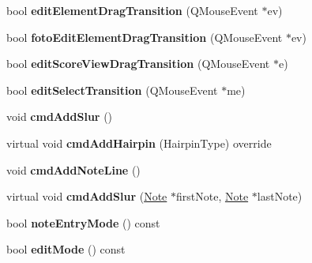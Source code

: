 \begin{DoxyCompactItemize}
\item 
\mbox{\label{class_ms_1_1_score_view_a52a05caf0364d3868f2f0c6b34c45731}} 
bool {\bfseries edit\+Element\+Drag\+Transition} (Q\+Mouse\+Event $\ast$ev)
\item 
\mbox{\label{class_ms_1_1_score_view_aec75a40560544239d6a45e458d9b5170}} 
bool {\bfseries foto\+Edit\+Element\+Drag\+Transition} (Q\+Mouse\+Event $\ast$ev)
\item 
\mbox{\label{class_ms_1_1_score_view_a9a9c293d74eb8e6818e21ff0d2d5de39}} 
bool {\bfseries edit\+Score\+View\+Drag\+Transition} (Q\+Mouse\+Event $\ast$e)
\item 
\mbox{\label{class_ms_1_1_score_view_a30ccf52ad72800d7af0e0ec2349bdeb9}} 
bool {\bfseries edit\+Select\+Transition} (Q\+Mouse\+Event $\ast$me)
\item 
\mbox{\label{class_ms_1_1_score_view_a6e68ebbffdbe0cabfa9780f1c2193951}} 
void {\bfseries cmd\+Add\+Slur} ()
\item 
\mbox{\label{class_ms_1_1_score_view_ac9aeb7f2f6ec32efbf2159f01789589c}} 
virtual void {\bfseries cmd\+Add\+Hairpin} (Hairpin\+Type) override
\item 
\mbox{\label{class_ms_1_1_score_view_ac4b421c6a812ee23383268d2dab74bff}} 
void {\bfseries cmd\+Add\+Note\+Line} ()
\item 
\mbox{\label{class_ms_1_1_score_view_a35e5b37e5e7ef4d56b8fb5c03be7f29f}} 
virtual void {\bfseries cmd\+Add\+Slur} (\hyperlink{class_ms_1_1_note}{Note} $\ast$first\+Note, \hyperlink{class_ms_1_1_note}{Note} $\ast$last\+Note)
\item 
\mbox{\label{class_ms_1_1_score_view_a766fb53e10ee7e2ef96a0140e4163538}} 
bool {\bfseries note\+Entry\+Mode} () const
\item 
\mbox{\label{class_ms_1_1_score_view_a5669436c1fd4244ffcd9483ae0f14303}} 
bool {\bfseries edit\+Mode} () const

\end{DoxyCompactItemize}
